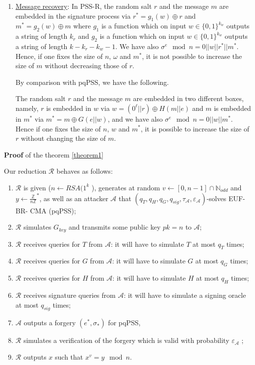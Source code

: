 \documentclass[a4paper,11pt]{article}
\begin{document}
\begin{enumerate}
\item \underline{Message recovery}: In PSS-R, the random salt $r$ and the message $m$ are embedded in the signature process via $r^*=g_1(w)\oplus r$ and $m^*=g_2(w)\oplus m$ where $g_1 $ is a function which on input $w\in\{0,1\}^{k_w}$ outputs a string of length $k_r$ and $g_2$ is a function which on input $w\in\{0,1\}^{k_w}$ outputs a string of length $k-k_r-k_w-1$. We have also $\sigma^e\mod n=0||w||r^*||m^*$. Hence, if one fixes the size of $n$, $\omega$ and $m^*$, it is not possible to increase the size of $m$ without decreasing those of $r$.

By comparison with pqPSS, we have the following.

The random salt $r$ and the message $m$ are embedded in two different boxes, namely, $r$ is embedded in $w$  via $w=(0^{\ell}||r)\oplus H(m||e)$ and $m$ is embedded in $m^*$  via $m^*=m\oplus G(e||w)$, and we have also $\sigma^{e}\mod n=0||w||m^*$. Hence if one fixes the size of $n$, $w$ and $m^*$, it is  possible to increase the size of $r$ without changing the size of $m$.%

\end{enumerate}


\textbf{Proof }  of the theorem \ref{theorem1}

Our reduction $\mathcal{R}$ behaves as follows:
 \begin{enumerate}
  \item  $\mathcal{R}$ is given ($n \leftarrow RSA(1^{k}$ ), generates at random $v \leftarrow [0, n-1]\cap \mathbb{N}_{odd}$  and $y
      \leftarrow \frac{\mathbb{Z}}{n\mathbb{Z}}^{*}$, as well as an attacker $\mathcal{A}$ that    $(q_{T}, q_{H}, q_{G}, q_{sig},
      \tau_{\mathcal{A}}, \varepsilon_{\mathcal{A}} )$-solves  EUF-BR- CMA (pqPSS);
 \item    $\mathcal{R}$ simulates $G_{key}$ and transmits some public key $pk=n$ to  $\mathcal{A}$;
\item     $\mathcal{R}$ receives queries for $T$ from  $\mathcal{A}$: it will have to simulate $T$ at most $q_{T}$ times;
\item     $\mathcal{R}$ receives queries for $G$ from  $\mathcal{A}$: it will have to simulate $G$ at most $q_{G}$ times;
\item     $\mathcal{R}$ receives queries for $H$ from  $\mathcal{A}$: it will have to simulate $H$ at most $q_{H}$ times;
\item     $\mathcal{R}$ receives signature queries from  $\mathcal{A}$: it will have to simulate a signing oracle at most $q_{sig}$ times;
\item     $\mathcal{A}$ outputs a forgery $(e^{*}, \sigma_{*})$ for pqPSS,
 \item    $\mathcal{R}$ simulates a verification of the forgery which is valid with probability $\varepsilon_{\mathcal{A}}$ ;
 \item    $\mathcal{R}$ outputs $x$ such that $x^{v} = y \mod n$.
\end{enumerate}
\end{document}
